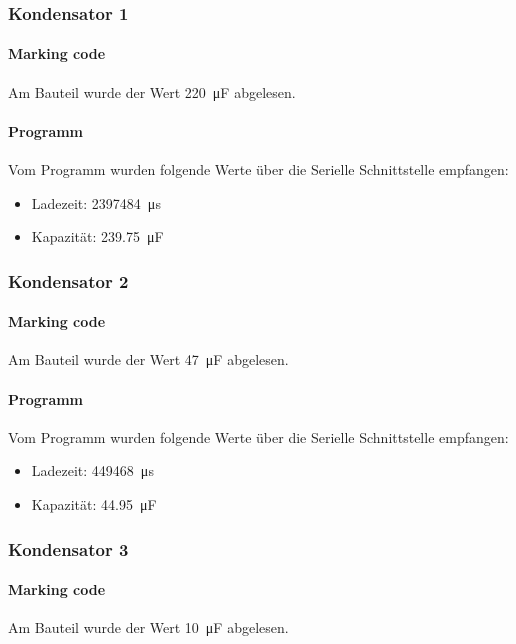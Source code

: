 \newpage
\subsubsection{Kondensator 1}

\paragraph{Marking code} Am Bauteil wurde der Wert \SI{220}{\micro\farad} abgelesen.

\paragraph{Programm} Vom Programm wurden folgende Werte über die Serielle Schnittstelle empfangen:

\begin{itemize}[noitemsep]
    \item Ladezeit: \SI{2397484}{\micro\second}
    \item Kapazität: \SI{239.75}{\micro\farad}
\end{itemize}

\subsubsection{Kondensator 2}

\paragraph{Marking code} Am Bauteil wurde der Wert \SI{47}{\micro\farad} abgelesen.

\paragraph{Programm} Vom Programm wurden folgende Werte über die Serielle Schnittstelle empfangen:

\begin{itemize}[noitemsep]
    \item Ladezeit: \SI{449468}{\micro\second}
    \item Kapazität: \SI{44.95}{\micro\farad}
\end{itemize}

\subsubsection{Kondensator 3}

\paragraph{Marking code} Am Bauteil wurde der Wert \SI{10}{\micro\farad} abgelesen.

